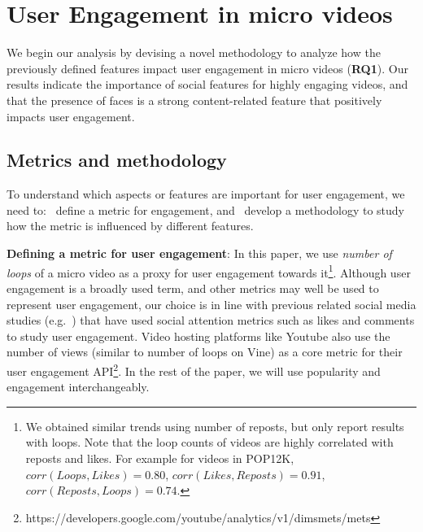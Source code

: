 \section{User Engagement in micro videos}
\label{sec:classifier}
We begin our analysis by devising a novel 
methodology to analyze how the previously defined features impact user engagement in micro videos (\textbf{RQ1}). Our results indicate the importance of social features for highly engaging videos, and that the presence of faces is a strong content-related feature that positively impacts user engagement.

\subsection{Metrics and methodology}
\label{sec:methodology}
To understand which aspects or features are important for user engagement, we need to: \one\ define a metric for engagement, and \two\ develop a methodology to study how the metric is influenced by different features. 

\noindent\textbf{Defining a metric for user engagement}:  In this paper, we  use \emph{number of loops} of a micro video as a proxy for user engagement towards it\footnote{We obtained similar trends using number of reposts, but only report results with loops. Note that the loop counts of videos are highly correlated with reposts and likes. For example for videos in POP12K, $ corr(Loops,Likes) = 0.80$, $corr(Likes,Reposts) = 0.91$, $corr(Reposts,Loops) = 0.74$.}.
Although user engagement is a broadly used term, and other metrics may well be used to represent user engagement, our choice is in line with previous related social media studies (e.g.~\cite{bakhshi2014faces})  that have used social attention metrics such as likes and comments to study user engagement. Video hosting platforms like Youtube also use the number of views (similar to number of loops on Vine) as a core metric for their user engagement API\footnote{\scriptsize https://developers.google.com/youtube/analytics/v1/dimsmets/mets}. In the rest of the paper, we will use popularity and engagement interchangeably.

